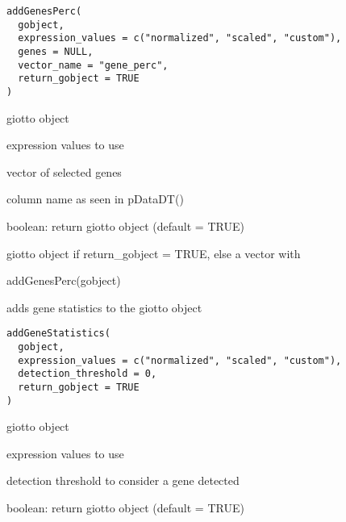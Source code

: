 \documentclass[a4paper]{book}
\begin{document}
%
\begin{Usage}
\begin{verbatim}
addGenesPerc(
  gobject,
  expression_values = c("normalized", "scaled", "custom"),
  genes = NULL,
  vector_name = "gene_perc",
  return_gobject = TRUE
)
\end{verbatim}
\end{Usage}
%
\begin{Arguments}
\begin{ldescription}
\item[\code{gobject}] giotto object

\item[\code{expression\_values}] expression values to use

\item[\code{genes}] vector of selected genes

\item[\code{vector\_name}] column name as seen in pDataDT()

\item[\code{return\_gobject}] boolean: return giotto object (default = TRUE)
\end{ldescription}
\end{Arguments}
%
\begin{Value}
giotto object if return\_gobject = TRUE, else a vector with 
\end{Value}
%
\begin{Examples}
\begin{ExampleCode}
    addGenesPerc(gobject)
\end{ExampleCode}
\end{Examples}
%
\begin{Description}\relax
adds gene statistics to the giotto object
\end{Description}
%
\begin{Usage}
\begin{verbatim}
addGeneStatistics(
  gobject,
  expression_values = c("normalized", "scaled", "custom"),
  detection_threshold = 0,
  return_gobject = TRUE
)
\end{verbatim}
\end{Usage}
%
\begin{Arguments}
\begin{ldescription}
\item[\code{gobject}] giotto object

\item[\code{expression\_values}] expression values to use

\item[\code{detection\_threshold}] detection threshold to consider a gene detected

\item[\code{return\_gobject}] boolean: return giotto object (default = TRUE)
\end{ldescription}
\end{Arguments}
\end{document}
